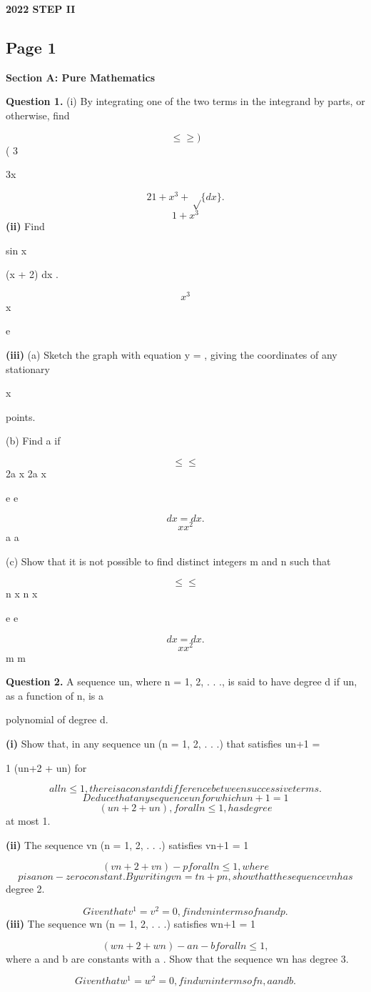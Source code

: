 \documentclass[12pt]{article}
\begin{document}
\begin{center}
{\Large \textbf{2022 STEP II}}
\end{center}

\subsection*{Page 1}
\begin{flushleft}
\bigskip\textbf{Section A: Pure Mathematics}\par
\bigskip\textbf{Question 1.} (i) By integrating one of the two terms in the integrand by parts, or otherwise, find\par
\[\leq \geq )\]
( 3\par
3x\par
\[2 1 + x^3 + \sqrt\{dx\} .\]
\[1 + x^3\]
\textbf{(ii)} Find \leq\par
sin x\par
(x + 2) dx .\par
\[x^3\]
x\par
e\par
\textbf{(iii)} (a) Sketch the graph with equation y = , giving the coordinates of any stationary\par
x\par
points.\par
(b) Find a if\par
\[\leq \leq\]
2a x 2a x\par
e e\par
\[dx = dx .\]
\[x x^2\]
a a\par
(c) Show that it is not possible to find distinct integers m and n such that\par
\[\leq \leq\]
n x n x\par
e e\par
\[dx = dx .\]
\[x x^2\]
m m\par
\bigskip\textbf{Question 2.} A sequence un, where n = 1, 2, . . ., is said to have degree d if un, as a function of n, is a\par
polynomial of degree d.\par
\textbf{(i)} Show that, in any sequence un (n = 1, 2, . . .) that satisfies un+1 =\par
1 (un+2 + un) for\par
\[all n \leq 1, there is a constant difference between successive terms.\]
\[Deduce that any sequence un for which un+1 = 1\]
\[(un+2 + un), for all n \leq 1, has degree\]
at most 1.\par
\textbf{(ii)} The sequence vn (n = 1, 2, . . .) satisfies vn+1 = 1\par
\[(vn+2 + vn) - p for all n \leq 1, where\]
\[p is a non-zero constant. By writing vn = tn + pn , show that the sequence vn has\]
degree 2.\par
\[Given that v^1 = v^2 = 0, find vn in terms of n and p.\]
\textbf{(iii)} The sequence wn (n = 1, 2, . . .) satisfies wn+1 = 1\par
\[(wn+2 + wn) - an - b for all n \leq 1,\]
where a and b are constants with a . Show that the sequence wn has degree 3.\par
\[Given that w^1 = w^2 = 0, find wn in terms of n, a and b.\]
\end{flushleft}
\end{document}

